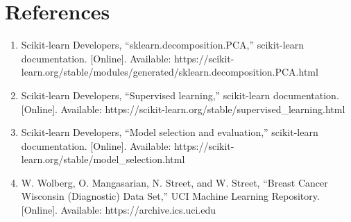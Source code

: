 \documentclass[12pt,a4paper]{article}
\begin{document}
\section{References}
\begin{enumerate}
\item Scikit-learn Developers, ``sklearn.decomposition.PCA,'' scikit-learn documentation. [Online]. Available: https://scikit-learn.org/stable/modules/generated/sklearn.decomposition.PCA.html
\item Scikit-learn Developers, ``Supervised learning,'' scikit-learn documentation. [Online]. Available: https://scikit-learn.org/stable/supervised\_learning.html
\item Scikit-learn Developers, ``Model selection and evaluation,'' scikit-learn documentation. [Online]. Available: https://scikit-learn.org/stable/model\_selection.html
\item W. Wolberg, O. Mangasarian, N. Street, and W. Street, ``Breast Cancer Wisconsin (Diagnostic) Data Set,'' UCI Machine Learning Repository. [Online]. Available: https://archive.ics.uci.edu
\end{enumerate}
\end{document}
